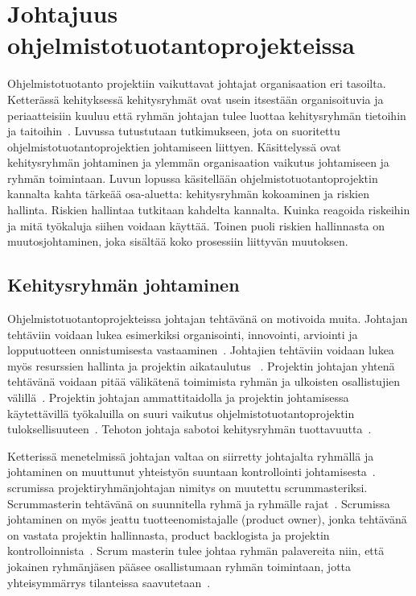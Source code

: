 \documentclass[finnish]{tktltiki2}
\theoremstyle{definition}
\theoremstyle{remark}
\begin{document}
   



  


\section{Johtajuus ohjelmistotuotantoprojekteissa}

Ohjelmistotuotanto projektiin vaikuttavat johtajat organisaation eri tasoilta. Ketterässä kehityksessä kehitysryhmät ovat usein itsestään organisoituvia ja periaatteisiin kuuluu että ryhmän johtajan tulee luottaa kehitysryhmän tietoihin ja taitoihin~\cite{fowler2001agile}. Luvussa tutustutaan tutkimukseen, jota on suoritettu ohjelmistotuotantoprojektien johtamiseen liittyen. Käsittelyssä ovat kehitysryhmän johtaminen ja ylemmän organisaation vaikutus johtamiseen ja ryhmän toimintaan. Luvun lopussa käsitellään ohjelmistotuotantoprojektin kannalta kahta tärkeää osa-aluetta: kehitysryhmän kokoaminen ja riskien hallinta. Riskien hallintaa tutkitaan kahdelta kannalta. Kuinka reagoida riskeihin ja mitä työkaluja siihen voidaan käyttää. Toinen puoli riskien hallinnasta on muutosjohtaminen, joka sisältää koko prosessiin liittyvän muutoksen.

\subsection{Kehitysryhmän johtaminen}

Ohjelmistotuotantoprojekteissa johtajan tehtävänä on motivoida muita. Johtajan tehtäviin voidaan lukea esimerkiksi organisointi, innovointi, arviointi ja lopputuotteen onnistumisesta vastaaminen~\cite{4017705}. Johtajien tehtäviin voidaan lukea myös resurssien hallinta ja projektin aikataulutus ~\cite{Dhomne:2012:ITL:2382887.2382899}. Projektin johtajan yhtenä tehtävänä voidaan pitää välikätenä toimimista ryhmän ja ulkoisten osallistujien välillä~\cite{McLeod:2011:FAS:1978802.1978803}. Projektin johtajan ammattitaidolla ja projektin johtamisessa käytettävillä työkaluilla on suuri vaikutus ohjelmistotuotantoprojektin tuloksellisuuteen~\cite{McLeod:2011:FAS:1978802.1978803}. Tehoton johtaja sabotoi kehitysryhmän tuottavuutta~\cite{bradley1997effect}.

Ketterissä menetelmissä johtajan valtaa on siirretty johtajalta ryhmällä ja johtaminen on muuttunut yhteistyön suuntaan kontrollointi johtamisesta~\cite{Nerur:2005:CMA:1060710.1060712}. scrumissa projektiryhmänjohtajan nimitys on muutettu scrummasteriksi. Scrummasterin tehtävänä on suunnitella ryhmä ja ryhmälle rajat~\cite{4755768}. Scrumissa johtaminen on myös jeattu tuotteenomistajalle (product owner), jonka tehtävänä on vastata projektin hallinnasta, product backlogista ja projektin kontrolloinnista~\cite{4755768}. Scrum masterin tulee johtaa ryhmän palavereita niin, että jokainen ryhmänjäsen pääsee osallistumaan ryhmän toimintaan, jotta yhteisymmärrys tilanteissa saavutetaan~\cite{bradley1997effect}. 
\end{document}
